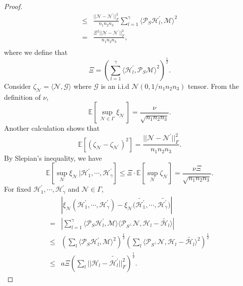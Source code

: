 \documentclass[journal,transmag]{IEEEtran}
\theoremstyle{plain}
\begin{document}
\begin{proof}
\begin{equation}
\begin{split}
\le& \frac{||\mathcal{N}-\mathcal{N}^{'}||^2_F}{n_1 n_2 n_3}\sum^{\gamma}_{l=1}\langle\mathcal{P}_{S}\mathcal{H}_l^{'},\mathcal{M}\rangle^2 \\
=& \frac{\Xi^2 ||\mathcal{N}-\mathcal{N}^{'}||^2_F}{n_1 n_2 n_3},\\
\end{split}
\end{equation}
where we define that
\begin{equation}
\Xi=(\sum^{\gamma}_{l=1}\langle\mathcal{H}_l^{'},\mathcal{P}_S\mathcal{M}\rangle^2)^{\frac{1}{2}}.
\end{equation}
Consider $\zeta_{\mathcal{N}}=\langle\mathcal{N},\mathcal{G}\rangle$ where $\mathcal{G}$ is an i.i.d $\mathcal{N}(0,1/n_1 n_2 n_3)$ tensor. From the definition of $\nu$,
\begin{equation}
\mathbb{E}[\,\sup_{\mathcal{N}\in\Gamma}\xi_{\mathcal{N}}\, ] =\frac{\nu}{\sqrt{n_1 n_2 n_3}}.
\end{equation}
Another calculation shows that
\begin{equation}
\mathbb{E}[(\zeta_{\mathcal{N}}-\zeta_{\mathcal{N}^{'}})^2]=\frac{||\mathcal{N}-\mathcal{N}^{'}||^2_F}{n_1 n_2 n_3}.
\end{equation}
By Slepian's inequality, we have
\begin{equation}
\mathbb{E}[\sup_{\mathcal{N}}\xi_{\mathcal{N}} \, | \mathcal{H}_1^{'},\cdots,\mathcal{H}_{\gamma}^{'}]\le \Xi \cdot \mathbb{E}[\sup_{\mathcal{N}}\zeta_{\mathcal{N}}] = \frac{\nu \Xi}{\sqrt{n_1 n_2 n_3}}.
\end{equation}
For fixed $\mathcal{H}_1^{'},\cdots,\mathcal{H}_{\gamma}^{'}$ and $\mathcal{N}\in \Gamma$,
\begin{equation}
\begin{split}
&|\xi_{\mathcal{N}}(\mathcal{H}_1^{'},\cdots,\mathcal{H}_{\gamma}^{'})
-\xi_{\mathcal{N}}(\tilde{\mathcal{H}_1^{'}},\cdots,\tilde{\mathcal{H}_{\gamma}^{'})}|\\
 =&| \sum^{\gamma}_{l=1}\langle\mathcal{P}_S \mathcal{H}_l^{'},\mathcal{M}\rangle\langle\mathcal{P}_{S^{\bot}}\mathcal{N},\mathcal{H}_l-\tilde{\mathcal{H}_l}\rangle |\\
 \le & (\sum_l \langle\mathcal{P}_S \mathcal{H}_l^{'},\mathcal{M}\rangle^2)^{\frac{1}{2}}
(\sum_l \langle\mathcal{P}_{S^{\bot}}\mathcal{N},\mathcal{H}_l-\tilde{\mathcal{H}_l}\rangle^2)^{\frac{1}{2}}\\
\le & a\Xi (\sum_l||\mathcal{H}_l-\tilde{\mathcal{H}_l^{'}}||_F^2)^{\frac{1}{2}}.
\end{split}

\end{equation}
\end{proof}
\end{document}
